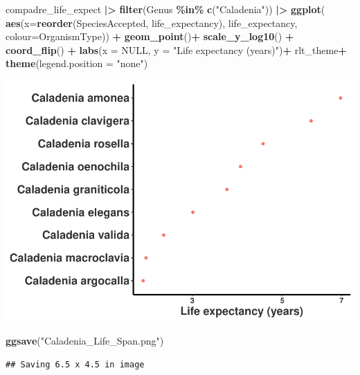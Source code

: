 \documentclass[
]{book}
\newenvironment{Shaded}{\begin{snugshade}}{\end{snugshade}}
\newcommand{\AttributeTok}[1]{\textcolor[rgb]{0.13,0.29,0.53}{#1}}
\newcommand{\ConstantTok}[1]{\textcolor[rgb]{0.56,0.35,0.01}{#1}}
\newcommand{\FunctionTok}[1]{\textcolor[rgb]{0.13,0.29,0.53}{\textbf{#1}}}
\newcommand{\NormalTok}[1]{#1}
\newcommand{\SpecialCharTok}[1]{\textcolor[rgb]{0.81,0.36,0.00}{\textbf{#1}}}
\newcommand{\StringTok}[1]{\textcolor[rgb]{0.31,0.60,0.02}{#1}}
\theoremstyle{definition}
\theoremstyle{definition}
\theoremstyle{definition}
\theoremstyle{definition}
\theoremstyle{remark}
\begin{document}
\begin{Shaded}
\begin{Highlighting}[]
\NormalTok{compadre\_life\_expect }\SpecialCharTok{|\textgreater{}} 
  \FunctionTok{filter}\NormalTok{(Genus }\SpecialCharTok{\%in\%} \FunctionTok{c}\NormalTok{(}\StringTok{"Caladenia"}\NormalTok{)) }\SpecialCharTok{|\textgreater{}} 
\FunctionTok{ggplot}\NormalTok{( }\FunctionTok{aes}\NormalTok{(}\AttributeTok{x=}\FunctionTok{reorder}\NormalTok{(SpeciesAccepted, life\_expectancy), life\_expectancy, }\AttributeTok{colour=}\NormalTok{OrganismType)) }\SpecialCharTok{+}
  \FunctionTok{geom\_point}\NormalTok{()}\SpecialCharTok{+}
  \FunctionTok{scale\_y\_log10}\NormalTok{() }\SpecialCharTok{+}
  \FunctionTok{coord\_flip}\NormalTok{() }\SpecialCharTok{+}
  \FunctionTok{labs}\NormalTok{(}\AttributeTok{x =} \ConstantTok{NULL}\NormalTok{, }\AttributeTok{y =} \StringTok{"Life expectancy (years)"}\NormalTok{)}\SpecialCharTok{+}
\NormalTok{  rlt\_theme}\SpecialCharTok{+}
  \FunctionTok{theme}\NormalTok{(}\AttributeTok{legend.position =} \StringTok{"none"}\NormalTok{)}
\end{Highlighting}
\end{Shaded}

\includegraphics{Diagnostico_Poblacional_files/figure-latex/chap16_29-1.pdf}

\begin{Shaded}
\begin{Highlighting}[]
\FunctionTok{ggsave}\NormalTok{(}\StringTok{"Caladenia\_Life\_Span.png"}\NormalTok{)}
\end{Highlighting}
\end{Shaded}

\begin{verbatim}
## Saving 6.5 x 4.5 in image
\end{verbatim}
\end{document}
